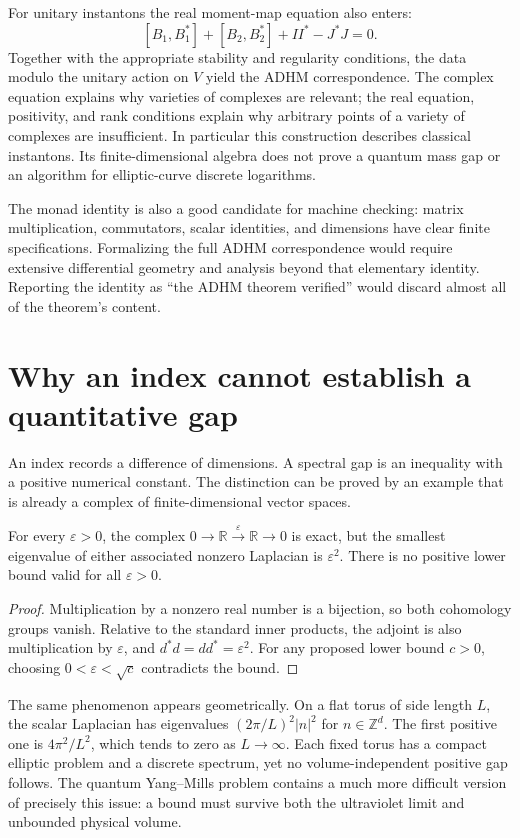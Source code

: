 For unitary instantons the real moment-map equation also enters:
\[
 [B_1,B_1^*]+[B_2,B_2^*]+II^*-J^*J=0.
\]
Together with the appropriate stability and regularity conditions, the
data modulo the unitary action on $V$ yield the ADHM correspondence.
The complex equation explains why varieties of complexes are relevant;
the real equation, positivity, and rank conditions explain why arbitrary
points of a variety of complexes are insufficient.  In particular this
construction describes classical instantons.  Its finite-dimensional
algebra does not prove a quantum mass gap or an algorithm for elliptic-curve
discrete logarithms.

The monad identity is also a good candidate for machine checking: matrix
multiplication, commutators, scalar identities, and dimensions have clear
finite specifications.  Formalizing the full ADHM correspondence would
require extensive differential geometry and analysis beyond that elementary
identity.  Reporting the identity as ``the ADHM theorem verified'' would
discard almost all of the theorem's content.

\section{Why an index cannot establish a quantitative gap}

An index records a difference of dimensions.  A spectral gap is an
inequality with a positive numerical constant.  The distinction can be
proved by an example that is already a complex of finite-dimensional
vector spaces.

\begin{proposition}
For every $\varepsilon>0$, the complex
$0\to\mathbb R\xrightarrow{\varepsilon}\mathbb R\to0$ is exact,
but the smallest eigenvalue of either associated nonzero Laplacian is
$\varepsilon^2$.  There is no positive lower bound valid for all
$\varepsilon>0$.
\end{proposition}

\begin{proof}
Multiplication by a nonzero real number is a bijection, so both cohomology
groups vanish.  Relative to the standard inner products, the adjoint is
also multiplication by $\varepsilon$, and $d^*d=dd^*=\varepsilon^2$.
For any proposed lower bound $c>0$, choosing
$0<\varepsilon<\sqrt c$ contradicts the bound.
\end{proof}

The same phenomenon appears geometrically.  On a flat torus of side length
$L$, the scalar Laplacian has eigenvalues
$(2\pi/L)^2|n|^2$ for $n\in\mathbb Z^d$.  The first positive one is
$4\pi^2/L^2$, which tends to zero as $L\to\infty$.  Each fixed torus
has a compact elliptic problem and a discrete spectrum, yet no
volume-independent positive gap follows.  The quantum Yang--Mills problem
contains a much more difficult version of precisely this issue: a bound
must survive both the ultraviolet limit and unbounded physical volume.

